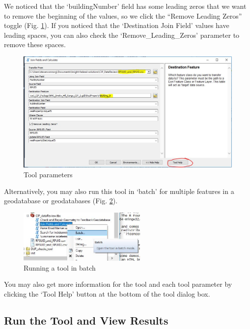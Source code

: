 \documentclass[openany]{book}
\theoremstyle{definition}
\theoremstyle{definition}
\theoremstyle{definition}
\theoremstyle{remark}
\begin{document}
We noticed that the `buildingNumber' field has some leading zeros that
we want to remove the beginning of the values, so we click the ``Remove
Leading Zeros'' toggle (Fig. \ref{fig:jcparams}). If you noticed that
the `Destination Join Field' values have leading spaces, you can also
check the `Remove\_Leading\_Zeros' parameter to remove these spaces.

\begin{figure}[H]

{\centering \includegraphics[width=5.18in,]{figures/joinCalc-toolparams} 

}

\caption{Tool parameters}\label{fig:jcparams}
\end{figure}

Alternatively, you may also run this tool in `batch' for multiple
features in a geodatabase or geodatabases (Fig. \ref{fig:batch}).

\begin{figure}[H]

{\centering \includegraphics[width=2.47in,]{figures/joinCalc-batch} 

}

\caption{Running a tool in batch}\label{fig:batch}
\end{figure}

You may also get more information for the tool and each tool parameter
by clicking the `Tool Help' button at the bottom of the tool dialog box.

\subsection{Run the Tool and View
Results}\label{run-the-tool-and-view-results-2}
\end{document}
